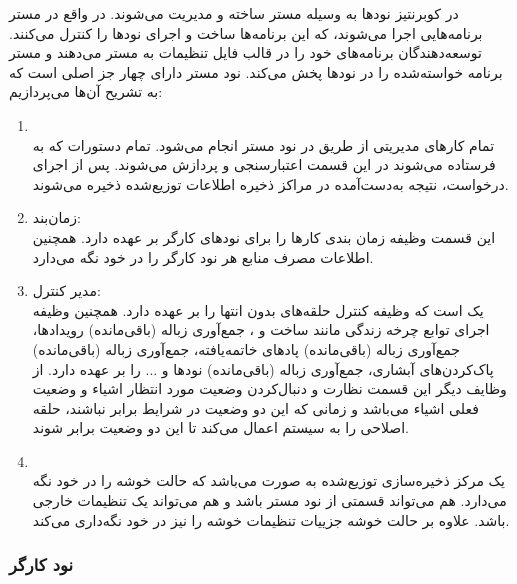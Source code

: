 در کوبرنتیز نودها به وسیله مستر ساخته و مدیریت می‌شوند. در واقع در مستر برنامه‌هایی اجرا می‌شوند، که این برنامه‌ها ساخت و اجرای نودها را کنترل می‌کنند. توسعه‌دهندگان برنامه‌های خود را در قالب فایل تنظیمات به مستر می‌دهند و مستر برنامه خواسته‌شده را در نودها پخش می‌کند.
\newline
\newline
نود مستر دارای چهار جز اصلی است که به تشریح آن‌ها می‌پردازیم:
\begin{enumerate}
	\item
	\\
	تمام کارهای مدیریتی از طریق  در نود مستر انجام می‌شود. تمام دستورات		که به		فرستاده می‌شوند در این قسمت اعتبارسنجی و پردازش می‌شوند. پس از اجرای درخواست، نتیجه به‌دست‌آمده در مراکز ذخیره اطلاعات توزیع‌شده ذخیره می‌شوند.
	\item
	زمان‌بند: \\
	این قسمت وظیفه زمان بندی کارها را برای نود‌های کارگر بر عهده دارد. همچنین اطلاعات مصرف منابع هر نود کارگر را در خود نگه می‌دارد.
	\item
	مدیر کنترل:\\
	یک	
	است که وظیفه کنترل حلقه‌های بدون انتها را بر عهده دارد. همچنین وظیفه اجرای توابع چرخه زندگی مانند ساخت	 و ، جمع‌آوری زباله (باقی‌مانده) رویدادها، جمع‌آوری زباله (باقی‌مانده) پادهای خاتمه‌یافته، جمع‌آوری زباله (باقی‌مانده) پاک‌کردن‌های آبشاری، جمع‌آوری زباله (باقی‌مانده) نودها و ... را بر عهده دارد. از وظایف دیگر این قسمت نظارت و دنبال‌کردن وضعیت مورد‌ انتظار اشیاء و وضعیت فعلی اشیاء می‌باشد و زمانی که این دو وضعیت در شرایط برابر نباشند، حلقه اصلاحی را به سیستم اعمال می‌کند تا این دو وضعیت برابر شوند.
	\item
	\\
	یک مرکز ذخیره‌سازی توزیع‌شده به صورت  می‌باشد که حالت خوشه را در خود نگه می‌دارد. هم می‌تواند قسمتی از نود مستر باشد و هم می‌تواند یک تنظیمات خارجی باشد. علاوه بر حالت خوشه جزییات تنظیمات خوشه را نیز در خود نگه‌داری می‌کند.
\end{enumerate}


\subsubsection*{نود کارگر}

